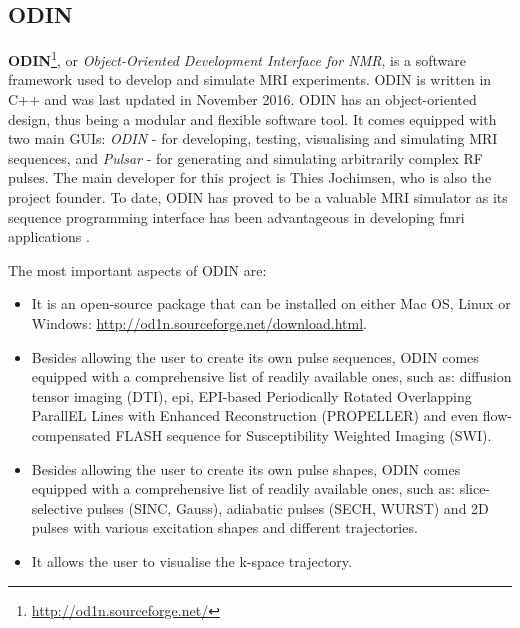 \hfill

\subsection{ODIN}
\textbf{ODIN}\footnote{\url{http://od1n.sourceforge.net/}}, or \textit{Object-Oriented Development Interface for NMR}, is a software framework used to develop and simulate MRI experiments.
ODIN is written in C++ and was last updated in November 2016.
ODIN has an object-oriented design, thus being a modular and flexible software tool.
It comes equipped with two main GUIs: \textit{ODIN} - for developing, testing, visualising and simulating MRI sequences, and \textit{Pulsar} - for generating and simulating arbitrarily complex RF pulses.
The main developer for this project is Thies Jochimsen, who is also the project founder.
To date, ODIN has proved to be a valuable MRI simulator as its sequence programming interface has been advantageous in developing \ac{fmri} applications \cite{Schafer2004}.

\hfill

The most important aspects of ODIN are:
\begin{itemize}

    \item It is an open-source package that can be installed on either Mac OS, Linux or Windows: \url{http://od1n.sourceforge.net/download.html}.
    
    \item Besides allowing the user to create its own pulse sequences, ODIN comes equipped with a comprehensive list of readily available ones, such as: diffusion tensor imaging (DTI), \ac{epi}, EPI-based Periodically Rotated Overlapping ParallEL Lines with Enhanced Reconstruction (PROPELLER) and even flow-compensated FLASH sequence for Susceptibility Weighted Imaging (SWI).
    
    \item Besides allowing the user to create its own pulse shapes, ODIN comes equipped with a comprehensive list of readily available ones, such as: slice-selective pulses (SINC, Gauss), 
    adiabatic pulses (SECH, WURST) and 2D pulses with various excitation shapes and different trajectories.
    
    \item It allows the user to visualise the k-space trajectory.
    
\end{itemize}

\hfill

